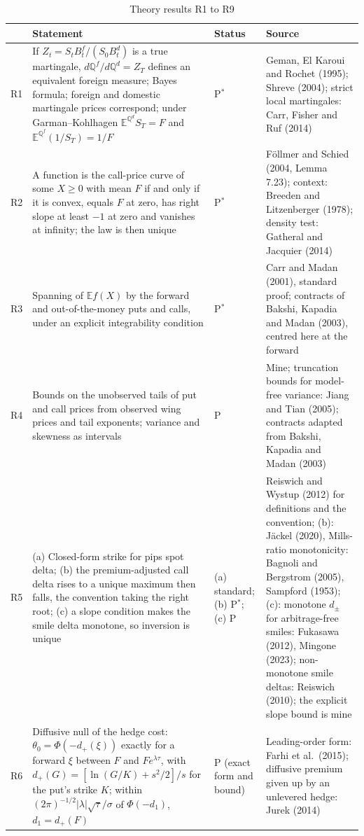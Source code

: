 \documentclass[11pt]{article}
\theoremstyle{result}
\newcommand{\E}{\mathbb{E}}
\newcommand{\Q}{\mathbb{Q}}
\begin{document}
\begin{table}[H]
\centering\footnotesize
\caption{Theory results R1 to R9}\label{tab:theory}
\begin{tabularx}{\linewidth}{@{}l>{\raggedright\arraybackslash\hsize=1.25\hsize}X>{\raggedright\arraybackslash}p{1.9cm}>{\raggedright\arraybackslash\hsize=0.75\hsize}X@{}}
\toprule
 & Statement & Status & Source \\
\midrule
R1 & If $Z_t=S_tB^f_t/(S_0B^d_t)$ is a true martingale, $d\Q^f/d\Q^d=Z_T$ defines an equivalent foreign measure; Bayes formula; foreign and domestic martingale prices correspond; under Garman--Kohlhagen $\E^{\Q^d}S_T=F$ and $\E^{\Q^f}(1/S_T)=1/F$ & P$^*$ & Geman, El Karoui and Rochet (1995); Shreve (2004); strict local martingales: Carr, Fisher and Ruf (2014) \\
R2 & A function is the call-price curve of some $X\ge0$ with mean $F$ if and only if it is convex, equals $F$ at zero, has right slope at least $-1$ at zero and vanishes at infinity; the law is then unique & P$^*$ & F\"ollmer and Schied (2004, Lemma 7.23); context: Breeden and Litzenberger (1978); density test: Gatheral and Jacquier (2014) \\
R3 & Spanning of $\E f(X)$ by the forward and out-of-the-money puts and calls, under an explicit integrability condition & P$^*$ & Carr and Madan (2001), standard proof; contracts of Bakshi, Kapadia and Madan (2003), centred here at the forward \\
R4 & Bounds on the unobserved tails of put and call prices from observed wing prices and tail exponents; variance and skewness as intervals & P & Mine; truncation bounds for model-free variance: Jiang and Tian (2005); contracts adapted from Bakshi, Kapadia and Madan (2003) \\
R5 & (a) Closed-form strike for pips spot delta; (b) the premium-adjusted call delta rises to a unique maximum then falls, the convention taking the right root; (c) a slope condition makes the smile delta monotone, so inversion is unique & (a) standard; (b) P$^*$; (c) P & Reiswich and Wystup (2012) for definitions and the convention; (b): J\"ackel (2020), Mills-ratio monotonicity: Bagnoli and Bergstrom (2005), Sampford (1953); (c): monotone $d_\pm$ for arbitrage-free smiles: Fukasawa (2012), Mingone (2023); non-monotone smile deltas: Reiswich (2010); the explicit slope bound is mine \\
R6 & Diffusive null of the hedge cost: $\theta_0=\Phi(-d_+(\xi))$ exactly for a forward $\xi$ between $F$ and $Fe^{\lambda\tau}$, with $d_+(G)=[\ln(G/K)+s^2/2]/s$ for the put's strike $K$; within $(2\pi)^{-1/2}|\lambda|\sqrt\tau/\sigma$ of $\Phi(-d_1)$, $d_1=d_+(F)$ & P (exact form and bound) & Leading-order form: Farhi et al.\ (2015); diffusive premium given up by an unlevered hedge: Jurek (2014) \\

\end{tabularx}
\end{table}
\end{document}
